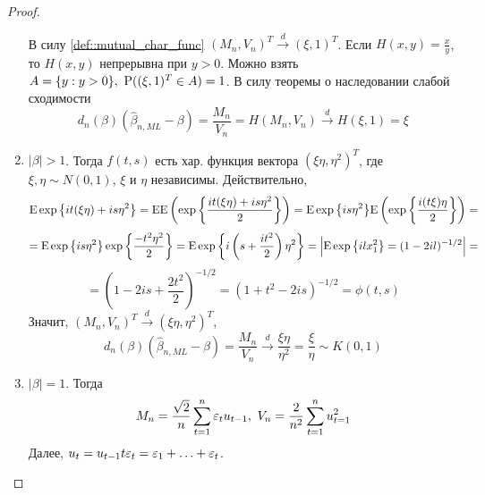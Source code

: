 \begin{proof}
\begin{enumerate}
\begin{theorem*}
        \end{theorem*}
        В силу \eqref{def::mutual_char_func} $(M_n,V_n)^T\xrightarrow{d}(\xi,1)^T$.
        Если $H(x,y)=\frac{x}{y}$, то $H(x,y)$  непрерывна при $y>0$.  Можно взять
        $A=\{y:y>0\},\ \P((\xi,1)^T\in A)=1$. В силу теоремы о наследовании
        слабой сходимости
        \[d_n(\beta)(\widehat{\beta}_{n,ML}-\beta)=\frac{M_n}{V_n}=H(M_n, V_n)\xrightarrow{d}H(\xi,1)=\xi\] 
        \item \underline{$\left\lvert \beta\right\rvert >1$}. Тогда $f(t,s)$ есть хар. функция 
        вектора $(\xi\eta,\eta^2)^T$, где $\xi,\eta\sim N(0,1)$, $\xi$ и $\eta$
        независимы. Действительно,
        \[\E\exp{\left\{it(\xi\eta)+is\eta^2\right\}}=\E\E\left(\exp{\left\{\frac{it(\xi\eta)+is\eta^2}{2}\right\}}\right)=\E\exp{\left\{is\eta^2\right\}}\E\left(\exp{\left\{\frac{i(t\xi)\eta}{2}\right\}}\right)=\]
        \[=\E\exp{\left\{is\eta^2\right\}}\exp{\left\{\frac{-t^2\eta^2}{2}\right\}}=\E\exp{\left\{i\left(s+\frac{it^2}{2}\right)\eta^2\right\}}=\Big\lvert\E\exp{\left\{ilx_1^2\right\}}=(1-2il)^{-1/2}\Big\rvert=\]
        \[=\left(1-2is+\frac{2t^2}{2}\right)^{-1/2}=(1+t^2-2is)^{-1/2}=\phi(t,s)\]
        Значит, $(M_n,V_n)^T\xrightarrow{d}(\xi\eta,\eta^2)^T$,
        \[d_n(\beta)(\widehat{\beta}_{n,ML}-\beta)=\frac{M_n}{V_n}\xrightarrow{d}\frac{\xi\eta}{\eta^2}=\frac{\xi}{\eta}\sim K(0,1)\]
        \item \underline{$\left\lvert \beta\right\rvert =1$}. Тогда
        \[M_n=\frac{\sqrt{2}}{n}\sum_{t=1}^n\eps_tu_{t-1},\ V_n=\frac{2}{n^2}\sum_{t=1}^nu_{t=1}^2\]
        Далее, $u_t=u_{t-1}t\eps_t=\eps_1+\ldots+\eps_t$.


\end{enumerate}
\end{proof}
